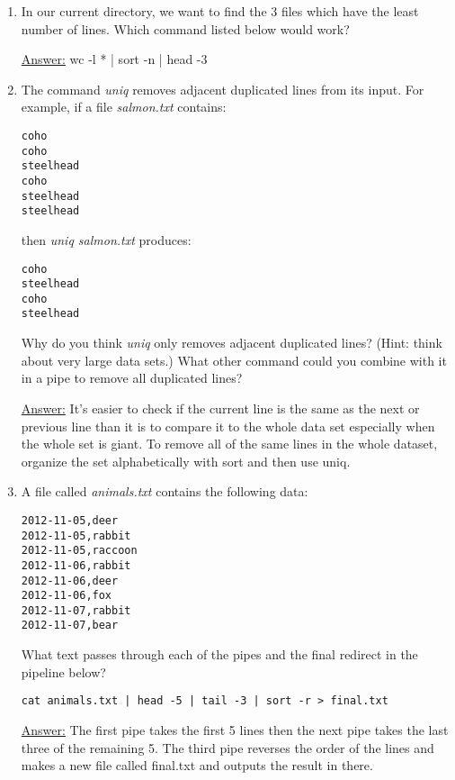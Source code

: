\documentclass[12pt]{article}
\begin{document}
\begin{enumerate}
\item In our current directory, we want to find the 3 files which have the least number of lines. Which command listed below would work?
\begin{center}
\textsf{\underline{Answer:} wc -l * | sort -n | head -3}
\end{center}

\item The command \emph{uniq} removes adjacent duplicated lines from its input. For example, if a file \emph{salmon.txt} contains:
\begin{flushleft}
\texttt{coho \\ coho \\ steelhead \\ coho \\ steelhead \\ steelhead}
\end{flushleft}
then \emph{uniq salmon.txt} produces:
\begin{flushleft}
\texttt{coho \\ steelhead \\ coho \\ steelhead}
\end{flushleft}
Why do you think \emph{uniq} only removes adjacent duplicated lines? (Hint: think about very large data sets.) What other command could you combine with it in a pipe to remove all duplicated lines?
\begin{center}
\textsf{\underline{Answer:} It’s easier to check if the current line is the same as the next or previous line than it is to compare it to the whole data set especially when the whole set is giant. To remove all of the same lines in the whole dataset, organize the set alphabetically with sort and then use uniq.}
\end{center}

\item A file called \emph{animals.txt} contains the following data:
\begin{flushleft}
\texttt{2012-11-05,deer \\ 2012-11-05,rabbit \\ 2012-11-05,raccoon \\ 2012-11-06,rabbit \\ 2012-11-06,deer \\ 2012-11-06,fox \\ 2012-11-07,rabbit \\ 2012-11-07,bear}
\end{flushleft}
What text passes through each of the pipes and the final redirect in the pipeline below?
\begin{flushleft}
\texttt{cat animals.txt | head -5 | tail -3 | sort -r > final.txt}
\end{flushleft}
\begin{center}
\textsf{\underline{Answer:} The first pipe takes the first 5 lines then the next pipe takes the last three of the remaining 5. The third pipe reverses the order of the lines and makes a new file called final.txt and outputs the result in there.}
\end{center}


\end{enumerate}
\end{document}

